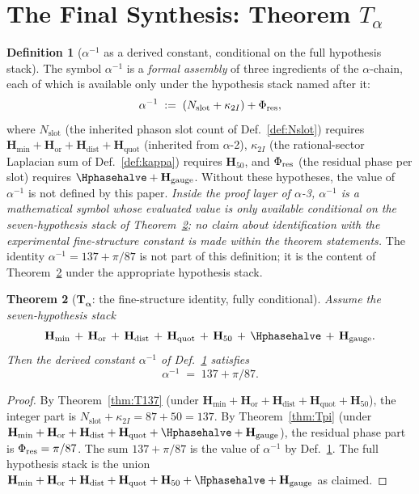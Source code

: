 \documentclass[11pt, a4paper]{amsart}
\newtheorem{theorem}{Theorem}[section]
\theoremstyle{definition}
\newtheorem{definition}[theorem]{Definition}
\newcommand{\Hmin}{\mathbf{H}_{\min}}
\newcommand{\Hor}{\mathbf{H}_{\mathrm{or}}}
\newcommand{\Hdist}{\mathbf{H}_{\mathrm{dist}}}
\newcommand{\Hquot}{\mathbf{H}_{\mathrm{quot}}}
\newcommand{\Hfifty}{\mathbf{H}_{50}}
\newcommand{\Hgauge}{\mathbf{H}_{\mathrm{gauge}}}
\newcommand{\Nslot}{N_{\mathrm{slot}}}
\newcommand{\kappaTwoI}{\kappa_{2I}}
\begin{document}
\section{The Final Synthesis: Theorem $T_\alpha$}
\label{sec:Talpha}

\begin{definition}[$\alpha^{-1}$ as a derived constant, conditional on the full hypothesis stack]
\label{def:alpha-inv}
The symbol $\alpha^{-1}$ is a \emph{formal assembly} of three
ingredients of the $\alpha$-chain, each of which is available
only under the hypothesis stack named after it:
\[
  \alpha^{-1} \;:=\; (\Nslot + \kappaTwoI) + \Phi_{\rm res},
\]
where $\Nslot$ (the inherited phason slot count of
Def.~\ref{def:Nslot}) requires $\Hmin + \Hor + \Hdist + \Hquot$
(inherited from $\alpha$-2), $\kappaTwoI$ (the rational-sector
Laplacian sum of Def.~\ref{def:kappa}) requires $\Hfifty$, and
$\Phi_{\rm res}$ (the residual phase per slot) requires
$\Hphasehalve + \Hgauge$. Without these hypotheses, the value
of $\alpha^{-1}$ is not defined by this paper. \emph{Inside the
proof layer of $\alpha$-3, $\alpha^{-1}$ is a mathematical
symbol whose evaluated value is only available conditional on
the seven-hypothesis stack of Theorem~\ref{thm:Talpha}; no claim
about identification with the experimental fine-structure
constant is made within the theorem statements.} The identity
$\alpha^{-1} = 137 + \pi/87$ is not part of this definition; it
is the content of Theorem~\ref{thm:Talpha} under the
appropriate hypothesis stack.
\end{definition}

\begin{theorem}[$\mathbf{T_\alpha}$: the fine-structure
  identity, fully conditional]
\label{thm:Talpha}
Assume the seven-hypothesis stack
\[
  \Hmin \,+\, \Hor \,+\, \Hdist \,+\, \Hquot \,+\,
  \Hfifty \,+\, \Hphasehalve \,+\, \Hgauge.
\]
Then the derived constant $\alpha^{-1}$ of
Def.~\ref{def:alpha-inv} satisfies
\[
  \alpha^{-1} \;=\; 137 + \pi/87.
\]
\end{theorem}

\begin{proof}
By Theorem~\ref{thm:T137} (under $\Hmin + \Hor + \Hdist +
\Hquot + \Hfifty$), the integer part is $\Nslot +
\kappaTwoI = 87 + 50 = 137$. By Theorem~\ref{thm:Tpi}
(under $\Hmin + \Hor + \Hdist + \Hquot + \Hphasehalve +
\Hgauge$), the residual phase part is $\Phi_{\rm res} =
\pi/87$. The sum $137 + \pi/87$ is the value of $\alpha^{-1}$
by Def.~\ref{def:alpha-inv}. The full hypothesis stack is the
union $\Hmin + \Hor + \Hdist + \Hquot + \Hfifty + \Hphasehalve
+ \Hgauge$ as claimed.
\end{proof}
\end{document}
